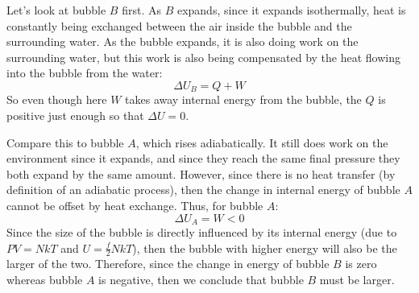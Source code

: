 \documentclass[11pt]{article}
\begin{document}
	\begin{solution}
		Let's look at bubble $B$ first. As $B$ expands, since it expands isothermally, heat is constantly 
		being exchanged between the air inside the bubble and the surrounding water. As the bubble expands, 
		it is also doing work on the surrounding water, but this work is also being compensated by the heat 
		flowing into the bubble from the water:
		\[
		\Delta U_B = Q + W
		\] 
		So even though here $W$ takes away internal energy from the bubble, the $Q$ is positive just enough so 
		that $\Delta U = 0$.

		Compare this to bubble $A$, which rises adiabatically. It still does work on the environment since 
		it expands, and since they reach the same final pressure they both expand by the same amount. However, 
		since there is no heat transfer (by definition of an adiabatic process), then the change in internal 
		energy of bubble $A$ cannot be offset by heat exchange. Thus, for bubble $A$:
		\[
		\Delta U_A = W < 0
		\] 
		Since the size of the bubble is directly influenced by its internal energy (due to $PV = NkT$ and 
		$U = \frac{f}{2}NkT$), then the bubble with higher energy will also be the larger of the two. Therefore, 
		since the change in energy of bubble $B$ is zero whereas bubble $A$ is negative, then we conclude 
		that bubble $B$ must be larger.
	\end{solution}

\end{document}
